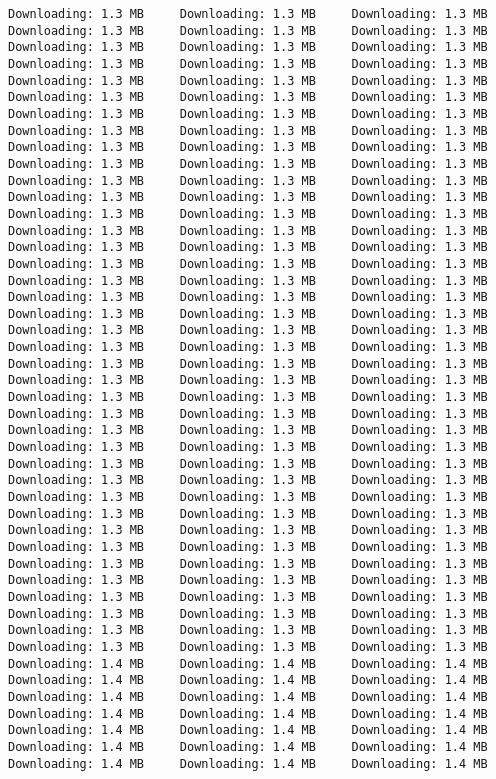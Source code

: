 \documentclass[
  12pt,
  portuguese,
]{report}
\begin{document}
\begin{verbatim}
Downloading: 1.3 MB     Downloading: 1.3 MB     Downloading: 1.3 MB     Downloading: 1.3 MB     Downloading: 1.3 MB     Downloading: 1.3 MB     Downloading: 1.3 MB     Downloading: 1.3 MB     Downloading: 1.3 MB     Downloading: 1.3 MB     Downloading: 1.3 MB     Downloading: 1.3 MB     Downloading: 1.3 MB     Downloading: 1.3 MB     Downloading: 1.3 MB     Downloading: 1.3 MB     Downloading: 1.3 MB     Downloading: 1.3 MB     Downloading: 1.3 MB     Downloading: 1.3 MB     Downloading: 1.3 MB     Downloading: 1.3 MB     Downloading: 1.3 MB     Downloading: 1.3 MB     Downloading: 1.3 MB     Downloading: 1.3 MB     Downloading: 1.3 MB     Downloading: 1.3 MB     Downloading: 1.3 MB     Downloading: 1.3 MB     Downloading: 1.3 MB     Downloading: 1.3 MB     Downloading: 1.3 MB     Downloading: 1.3 MB     Downloading: 1.3 MB     Downloading: 1.3 MB     Downloading: 1.3 MB     Downloading: 1.3 MB     Downloading: 1.3 MB     Downloading: 1.3 MB     Downloading: 1.3 MB     Downloading: 1.3 MB     Downloading: 1.3 MB     Downloading: 1.3 MB     Downloading: 1.3 MB     Downloading: 1.3 MB     Downloading: 1.3 MB     Downloading: 1.3 MB     Downloading: 1.3 MB     Downloading: 1.3 MB     Downloading: 1.3 MB     Downloading: 1.3 MB     Downloading: 1.3 MB     Downloading: 1.3 MB     Downloading: 1.3 MB     Downloading: 1.3 MB     Downloading: 1.3 MB     Downloading: 1.3 MB     Downloading: 1.3 MB     Downloading: 1.3 MB     Downloading: 1.3 MB     Downloading: 1.3 MB     Downloading: 1.3 MB     Downloading: 1.3 MB     Downloading: 1.3 MB     Downloading: 1.3 MB     Downloading: 1.3 MB     Downloading: 1.3 MB     Downloading: 1.3 MB     Downloading: 1.3 MB     Downloading: 1.3 MB     Downloading: 1.3 MB     Downloading: 1.3 MB     Downloading: 1.3 MB     Downloading: 1.3 MB     Downloading: 1.3 MB     Downloading: 1.3 MB     Downloading: 1.3 MB     Downloading: 1.3 MB     Downloading: 1.3 MB     Downloading: 1.3 MB     Downloading: 1.3 MB     Downloading: 1.3 MB     Downloading: 1.3 MB     Downloading: 1.3 MB     Downloading: 1.3 MB     Downloading: 1.3 MB     Downloading: 1.3 MB     Downloading: 1.3 MB     Downloading: 1.3 MB     Downloading: 1.3 MB     Downloading: 1.3 MB     Downloading: 1.3 MB     Downloading: 1.3 MB     Downloading: 1.3 MB     Downloading: 1.3 MB     Downloading: 1.3 MB     Downloading: 1.3 MB     Downloading: 1.3 MB     Downloading: 1.3 MB     Downloading: 1.3 MB     Downloading: 1.3 MB     Downloading: 1.3 MB     Downloading: 1.3 MB     Downloading: 1.3 MB     Downloading: 1.3 MB     Downloading: 1.3 MB     Downloading: 1.3 MB     Downloading: 1.3 MB     Downloading: 1.3 MB     Downloading: 1.3 MB     Downloading: 1.3 MB     Downloading: 1.3 MB     Downloading: 1.3 MB     Downloading: 1.3 MB     Downloading: 1.3 MB     Downloading: 1.3 MB     Downloading: 1.4 MB     Downloading: 1.4 MB     Downloading: 1.4 MB     Downloading: 1.4 MB     Downloading: 1.4 MB     Downloading: 1.4 MB     Downloading: 1.4 MB     Downloading: 1.4 MB     Downloading: 1.4 MB     Downloading: 1.4 MB     Downloading: 1.4 MB     Downloading: 1.4 MB     Downloading: 1.4 MB     Downloading: 1.4 MB     Downloading: 1.4 MB     Downloading: 1.4 MB     Downloading: 1.4 MB     Downloading: 1.4 MB     Downloading: 1.4 MB     Downloading: 1.4 MB     Downloading: 1.4 MB     
\end{verbatim}
\end{document}
